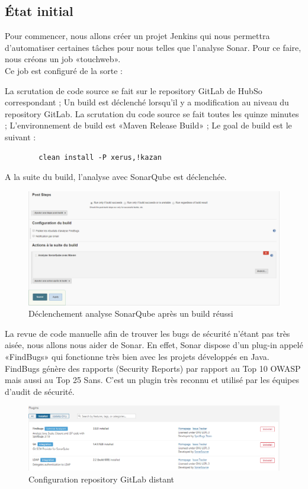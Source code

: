 \subsection{État initial}
Pour commencer, nous allons créer un projet Jenkins qui nous permettra d'automatiser certaines tâches pour nous telles que l'analyse Sonar. Pour ce faire, nous créons un job «touchweb». \\
Ce job est configuré de la sorte :
\begin{itemize}
	\itemcheck La scrutation de code source se fait sur le repository GitLab de HubSo correspondant ;
	\itemcheck Un build est déclenché lorsqu'il y a modification au niveau du repository GitLab. La scrutation du code source se fait toutes les quinze minutes ;
	\itemcheck L'environnement de build est «Maven Release Build» ;
	\itemcheck Le goal de build est le suivant :
	\begin{verbatim}
		clean install -P xerus,!kazan
	\end{verbatim}
	\itemcheck A la suite du build, l'analyse avec SonarQube est déclenchée.
\end{itemize} 
\begin{figure}[H]
	\centering
	\begin{minipage}{12cm}
		\centering
		\includegraphics[width=1\textwidth]{fig/sonar-post-action.png}
	\end{minipage}
	\caption{Déclenchement analyse SonarQube après un build réussi}
	\label{fig:vccdfxdfs}
\end{figure}
La revue de code manuelle afin de trouver les bugs de sécurité n'étant pas très aisée, nous allons nous aider de Sonar. En effet, Sonar dispose d'un plug-in appelé «FindBugs» qui fonctionne très bien avec les projets développés en Java. FindBugs génère des rapports (Security Reports) par rapport au Top 10 OWASP mais aussi au Top 25 Sans. C'est un plugin très reconnu et utilisé par les équipes d'audit de sécurité. 
\begin{figure}[H]
	\centering
	\begin{minipage}{12cm}
		\centering
		\includegraphics[width=1\textwidth]{fig/findbugs-plugin.png}
	\end{minipage}
	\caption{Configuration repository GitLab distant}
	\label{fig:vccdfxdfs}
\end{figure}
